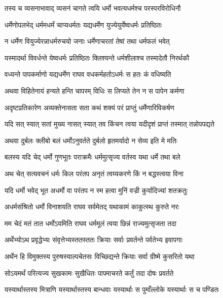 \twolineshloka
{तस्य च व्यसनाभावाद् व्यसनं चागते त्वयि}
{धर्मो भवत्यधर्मश्च परस्परविरोधिनौ} %

\twolineshloka
{धर्मेणोपलभेद् धर्ममधर्मं चाप्यधर्मतः}
{यद्यधर्मेण युज्येयुर्येष्वधर्मः प्रतिष्ठितः} %

\twolineshloka
{न धर्मेण वियुज्येरन्नाधर्मरुचयो जनाः}
{धर्मेणाचरतां तेषां तथा धर्मफलं भवेत्} %

\twolineshloka
{यस्मादर्था विवर्धन्ते येष्वधर्मः प्रतिष्ठितः}
{क्लिश्यन्ते धर्मशीलाश्च तस्मादेतौ निरर्थकौ} %

\twolineshloka
{वध्यन्ते पापकर्माणो यद्यधर्मेण राघव}
{वधकर्महतोऽधर्मः स हतः कं वधिष्यति} %

\twolineshloka
{अथवा विहितेनायं हन्यते हन्ति चापरम्}
{विधिः स लिप्यते तेन न स पापेन कर्मणा} %

\twolineshloka
{अदृष्टप्रतिकारेण अव्यक्तेनासता सता}
{कथं शक्यं परं प्राप्तुं धर्मेणारिविकर्षण} %

\twolineshloka
{यदि सत् स्यात् सतां मुख्य नासत् स्यात् तव किंचन}
{त्वया यदीदृशं प्राप्तं तस्मात् तन्नोपपद्यते} %

\twolineshloka
{अथवा दुर्बलः क्लीबो बलं धर्मोऽनुवर्तते}
{दुर्बलो हृतमर्यादो न सेव्य इति मे मतिः} %

\twolineshloka
{बलस्य यदि चेद् धर्मो गुणभूतः पराक्रमैः}
{धर्ममुत्सृज्य वर्तस्व यथा धर्मे तथा बले} %

\twolineshloka
{अथ चेत् सत्यवचनं धर्मः किल परंतप}
{अनृतं त्वय्यकरणे किं न बद्धस्त्वया विना} %

\twolineshloka
{यदि धर्मो भवेद् भूत अधर्मो वा परंतप}
{न स्म हत्वा मुनिं वज्री कुर्यादिज्यां शतक्रतुः} %

\twolineshloka
{अधर्मसंश्रितो धर्मो विनाशयति राघव}
{सर्वमेतद् यथाकामं काकुत्स्थ कुरुते नरः} %

\twolineshloka
{मम चेदं मतं तात धर्मोऽयमिति राघव}
{धर्ममूलं त्वया छिन्नं राज्यमुत्सृजता तदा} %

\twolineshloka
{अर्थेभ्योऽथ प्रवृद्धेभ्यः संवृत्तेभ्यस्ततस्ततः}
{क्रियाः सर्वाः प्रवर्तन्ते पर्वतेभ्य इवापगाः} %

\twolineshloka
{अर्थेन हि विमुक्तस्य पुरुषस्याल्पचेतसः}
{विच्छिद्यन्ते क्रियाः सर्वा ग्रीष्मे कुसरितो यथा} %

\twolineshloka
{सोऽयमर्थं परित्यज्य सुखकामः सुखैधितः}
{पापमाचरते कर्तुं तदा दोषः प्रवर्तते} %

\twolineshloka
{यस्यार्थास्तस्य मित्राणि यस्यार्थास्तस्य बान्धवाः}
{यस्यार्थाः स पुमाँल्लोके यस्यार्थाः स च पण्डितः} %

